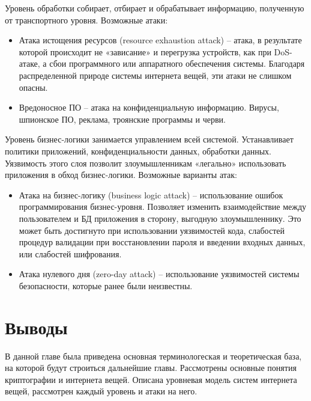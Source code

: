 Уровень обработки собирает, отбирает и обрабатывает информацию, полученную от транспортного уровня. Возможные атаки:
\begin{itemize}
	\item Атака истощения ресурсов (resource exhaustion attack) – атака, в результате которой происходит не «зависание» и перегрузка устройств, как при DoS-атаке, а сбои программного или аппаратного обеспечения системы. Благодаря распределенной природе системы интернета вещей, эти атаки не слишком опасны.
	\item Вредоносное ПО – атака на конфиденциальную информацию. Вирусы, шпионское ПО, реклама, троянские программы и черви. 
\end{itemize}

Уровень бизнес-логики занимается управлением всей системой. Устанавливает политики приложений, конфиденциальности данных, обработки данных. Уязвимость этого слоя позволит злоумышленникам «легально» использовать приложения в обход бизнес-логики. Возможные варианты атак:
\begin{itemize}
	\item Атака на бизнес-логику (business logic attack) – использование ошибок программирования бизнес-уровня. Позволяет изменить взаимодействие между пользователем и БД приложения в сторону, выгодную злоумышленнику. Это может быть достигнуто при использовании уязвимостей кода, слабостей процедур валидации при восстановлении пароля и введении входных данных, или слабостей шифрования.
	\item Атака нулевого дня (zero-day attack) – использование уязвимостей системы безопасности, которые ранее были неизвестны.
\end{itemize}

\section{Выводы} \label{ch1:conclusion}

В данной главе была приведена основная терминологеская и теоретическая база, на которой будут строиться дальнейшие главы. Рассмотрены основные понятия криптографии и интернета вещей. Описана уровневая модель систем интернета вещей, рассмотрен каждый уровень и атаки на него.

\newpage

%
